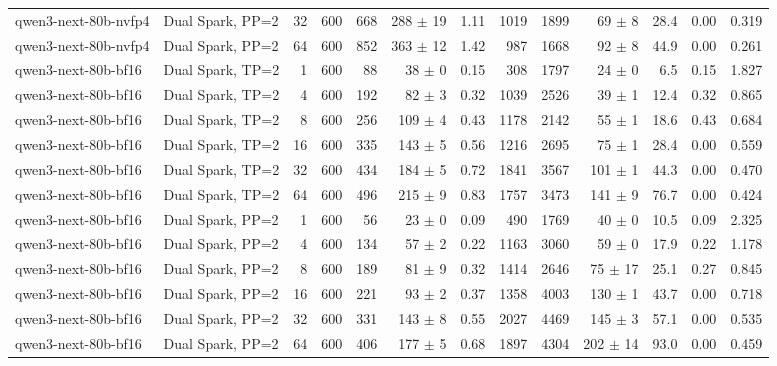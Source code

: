 \begin{tabular}{l l r r r r r r r r r r r}
qwen3-next-80b-nvfp4 & Dual Spark, PP=2 & 32 & 600 & 668 & 288 $\pm$ 19 & 1.11 & 1019 & 1899 & 69 $\pm$ 8 & 28.4 & 0.00 & 0.319 \\
qwen3-next-80b-nvfp4 & Dual Spark, PP=2 & 64 & 600 & 852 & 363 $\pm$ 12 & 1.42 & 987 & 1668 & 92 $\pm$ 8 & 44.9 & 0.00 & 0.261 \\
\addlinespace
qwen3-next-80b-bf16 & Dual Spark, TP=2 & 1 & 600 & 88\rlap{$^\dagger$} & 38 $\pm$ 0 & 0.15 & 308 & 1797 & 24 $\pm$ 0 & 6.5 & 0.15 & 1.827 \\
qwen3-next-80b-bf16 & Dual Spark, TP=2 & 4 & 600 & 192 & 82 $\pm$ 3 & 0.32 & 1039 & 2526 & 39 $\pm$ 1 & 12.4 & 0.32 & 0.865 \\
qwen3-next-80b-bf16 & Dual Spark, TP=2 & 8 & 600 & 256 & 109 $\pm$ 4 & 0.43 & 1178 & 2142 & 55 $\pm$ 1 & 18.6 & 0.43 & 0.684 \\
qwen3-next-80b-bf16 & Dual Spark, TP=2 & 16 & 600 & 335 & 143 $\pm$ 5 & 0.56 & 1216 & 2695 & 75 $\pm$ 1 & 28.4 & 0.00 & 0.559 \\
qwen3-next-80b-bf16 & Dual Spark, TP=2 & 32 & 600 & 434 & 184 $\pm$ 5 & 0.72 & 1841 & 3567 & 101 $\pm$ 1 & 44.3 & 0.00 & 0.470 \\
qwen3-next-80b-bf16 & Dual Spark, TP=2 & 64 & 600 & 496 & 215 $\pm$ 9 & 0.83 & 1757 & 3473 & 141 $\pm$ 9 & 76.7 & 0.00 & 0.424 \\
\addlinespace
qwen3-next-80b-bf16 & Dual Spark, PP=2 & 1 & 600 & 56\rlap{$^\dagger$} & 23 $\pm$ 0 & 0.09 & 490 & 1769 & 40 $\pm$ 0 & 10.5 & 0.09 & 2.325 \\
qwen3-next-80b-bf16 & Dual Spark, PP=2 & 4 & 600 & 134 & 57 $\pm$ 2 & 0.22 & 1163 & 3060 & 59 $\pm$ 0 & 17.9 & 0.22 & 1.178 \\
qwen3-next-80b-bf16 & Dual Spark, PP=2 & 8 & 600 & 189 & 81 $\pm$ 9 & 0.32 & 1414 & 2646 & 75 $\pm$ 17 & 25.1 & 0.27 & 0.845 \\
qwen3-next-80b-bf16 & Dual Spark, PP=2 & 16 & 600 & 221 & 93 $\pm$ 2 & 0.37 & 1358 & 4003 & 130 $\pm$ 1 & 43.7 & 0.00 & 0.718 \\
qwen3-next-80b-bf16 & Dual Spark, PP=2 & 32 & 600 & 331 & 143 $\pm$ 8 & 0.55 & 2027 & 4469 & 145 $\pm$ 3 & 57.1 & 0.00 & 0.535 \\
qwen3-next-80b-bf16 & Dual Spark, PP=2 & 64 & 600 & 406 & 177 $\pm$ 5 & 0.68 & 1897 & 4304 & 202 $\pm$ 14 & 93.0 & 0.00 & 0.459 \\
\bottomrule
\end{tabular}
